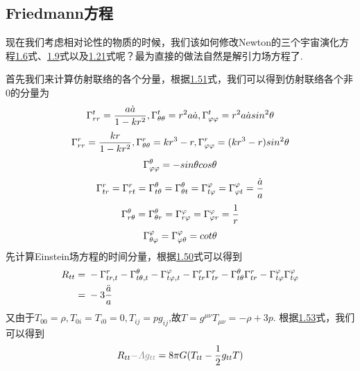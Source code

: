 \documentclass[a4paper]{book}
\begin{document}
\subsection{Friedmann方程}
现在我们考虑相对论性的物质的时候，我们该如何修改Newton的三个宇宙演化方程\hyperref[1.6]{1.6}式、\hyperref[1.9]{1.9}式以及\hyperref[1.21]{1.21}式呢？最为直接的做法自然是解引力场方程了.\par 
首先我们来计算仿射联络的各个分量，根据\hyperref[1.51]{1.51}式，我们可以得到仿射联络各个非0的分量为
\begin{equation}
	\Gamma^{t}_{rr}=\frac{a\dot{a}}{1-kr^2},	\Gamma^{t}_{\theta\theta}=r^2a\dot{a},
	\Gamma^{t}_{\varphi\varphi}=r^2a\dot{a}sin^2\theta
	 \notag
\end{equation}
\begin{equation}
	\Gamma^{r}_{rr}=\frac{kr}{1-kr^2},
	\Gamma^{r}_{\theta\theta}=kr^3-r,
	\Gamma^{r}_{\varphi\varphi}=(kr^3-r)sin^2\theta\notag
\end{equation}
\begin{equation}
	\Gamma^{\theta}_{\varphi\varphi}=-sin\theta cos\theta\notag
\end{equation}
\begin{equation}
\Gamma^{r}_{tr}=\Gamma^{r}_{rt}=
\Gamma^{\theta}_{t\theta}=\Gamma^{\theta}_{\theta t}=	\Gamma^{\varphi}_{t\varphi}=\Gamma^{\varphi}_{\varphi t}=\frac{\dot{a}}{a} \notag
\end{equation}
\begin{equation}
	\Gamma^{\theta}_{r\theta}=\Gamma^{\theta}_{\theta r}=
	\Gamma^{\varphi}_{r\varphi}=\Gamma^{\varphi}_{\varphi r}=\frac{1}{r} \notag
\end{equation}
\begin{equation}
	\Gamma^{\varphi}_{\theta\varphi}=\Gamma^{\varphi}_{\varphi\theta}=cot\theta \notag
\end{equation}
先计算Einstein场方程的时间分量，根据\hyperref[1.50]{1.50}式可以得到
\begin{align}
	R_{tt}={}&-\Gamma^{r}_{tr,t}-\Gamma^{\theta}_{t\theta,t}-\Gamma^{\varphi}_{t\varphi,t}-\Gamma^{r}_{tr}\Gamma^{r}_{tr}-\Gamma^{\theta}_{t\theta}\Gamma^{r}_{tr}-\Gamma^{\varphi}_{t\varphi}\Gamma^{\varphi}_{t\varphi} \notag\\ 
	={}& -3\frac{\ddot{a}}{a}
\end{align}
又由于$T_{00}=\rho,T_{0i}=T_{i0}=0,T_{ij}=pg_{ij}$,故$T=g^{\mu\nu}T_{\mu\nu}=-\rho+3p$.
根据\hyperref[1.53]{1.53}式，我们可以得到
\begin{equation}
	R_{tt}\textcolor{gray}{-\varLambda g_{tt}}=8\pi G(T_{tt}-\frac{1}{2}g_{tt}T)
\end{equation}
\end{document}
